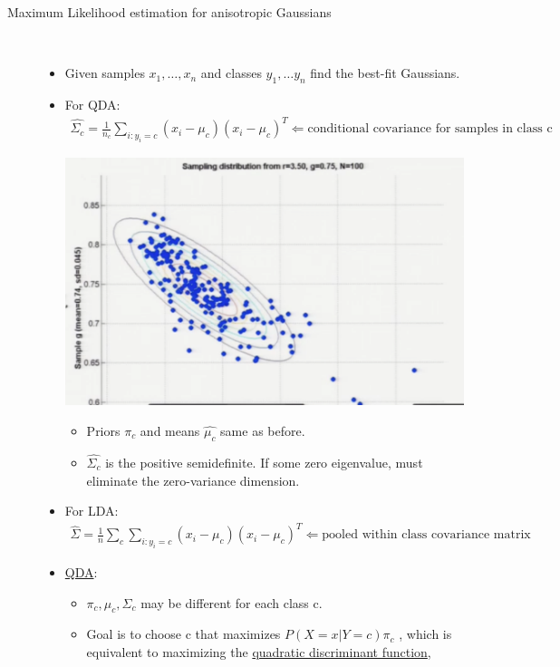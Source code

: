 \documentclass[10pt]{article}
\begin{document}
\begin{description}
		\item[Maximum Likelihood estimation for anisotropic Gaussians]
			\
			\begin{itemize}
				\item Given samples $x_{1}, \dots, x_{n}$ and classes $y_{1}, \dots y_{n}$ find the best-fit Gaussians.
				\item For QDA:
					\begin{align*}
						\hat{\Sigma_{c}} = \frac{1}{n_{c}} \sum_{i:y_{i}=c} (x_{i} - \mu_{c})(x_{i} - \mu_{c})^{T} \Leftarrow \text{conditional covariance for samples in class c}
					\end{align*}
					\begin{center}
						\includegraphics[scale=0.5]{images/smaple}
					\end{center}
					\begin{itemize}
					\item Priors $\pi_{c}$ and means $\hat{\mu_{c}}$ same as before.
					\item $\hat{\Sigma_{c}}$ is the positive semidefinite. If some zero eigenvalue, must eliminate the zero-variance dimension.
					\end{itemize}
				\item For LDA:
					\begin{align*}
						\hat{\Sigma} = \frac{1}{n} \sum_{c} \sum_{i:y_{i}=c} (x_{i} - \mu_{c})(x_{i} - \mu_{c})^{T} \Leftarrow \text{pooled within class covariance matrix}
					\end{align*}
				\item \underline{QDA}:
					\begin{itemize}
						\item $\pi_{c}, \mu_{c}, \Sigma_{c}$ may be different for each class c.
						\item Goal is to choose c that maximizes $P(X=x|Y=c)\pi_{c}$ , which is equivalent to maximizing the \underline{quadratic discriminant function},

\end{itemize}
\end{itemize}
\end{description}
\end{document}
